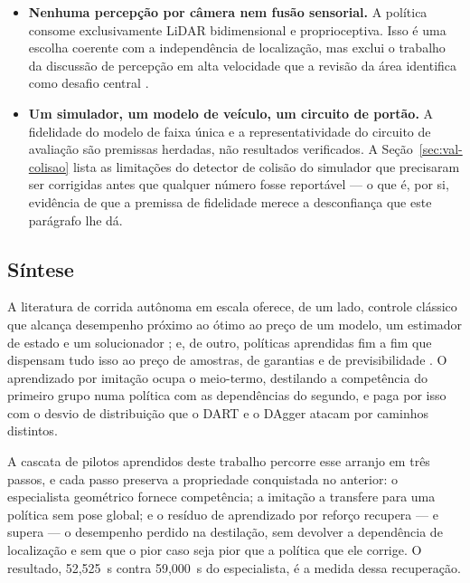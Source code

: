 \begin{itemize}
          melhoram a cada volta executada. A política aqui é fixa após o treino.
    \item \textbf{Nenhuma percepção por câmera nem fusão sensorial.} A política
          consome exclusivamente LiDAR bidimensional e proprioceptiva. Isso é uma
          escolha coerente com a independência de localização, mas exclui o trabalho da
          discussão de percepção em alta velocidade que a revisão da área
          identifica como desafio central \cite{Betz2022Survey}.
    \item \textbf{Um simulador, um modelo de veículo, um circuito de portão.} A
          fidelidade do modelo de faixa única e a representatividade do circuito
          de avaliação são premissas herdadas, não resultados verificados. A
          Seção~\ref{sec:val-colisao} lista as limitações do detector de
          colisão do simulador que precisaram ser corrigidas antes que qualquer
          número fosse reportável --- o que é, por si, evidência de que a premissa
          de fidelidade merece a desconfiança que este parágrafo lhe dá.
\end{itemize}

\subsection{Síntese}

A literatura de corrida autônoma em escala oferece, de um lado, controle clássico
que alcança desempenho próximo ao ótimo ao preço de um modelo, um estimador de
estado e um solucionador \cite{Heilmeier2020MinCurv, Wang2020LMPC,
Jain2020Bayesrace}; e, de outro, políticas aprendidas fim a fim que dispensam
tudo isso ao preço de amostras, de garantias e de previsibilidade
\cite{Evans2023Comparing, Stachowicz2023FastRLAP}. O aprendizado por imitação
ocupa o meio-termo, destilando a competência do primeiro grupo numa política com
as dependências do segundo, e paga por isso com o desvio de distribuição que o
DART \cite{Laskey2017DART} e o DAgger \cite{Ross2011DAgger} atacam por caminhos
distintos.

A cascata de pilotos aprendidos deste trabalho percorre esse arranjo em três passos, e cada
passo preserva a propriedade conquistada no anterior: o especialista geométrico
fornece competência; a imitação a transfere para uma política sem pose global; e
o resíduo de aprendizado por reforço recupera --- e supera --- o desempenho
perdido na destilação, sem devolver a dependência de localização e sem que o pior
caso seja pior que a política que ele corrige. O resultado, 52,525~s contra
59,000~s do especialista, é a medida dessa recuperação.

